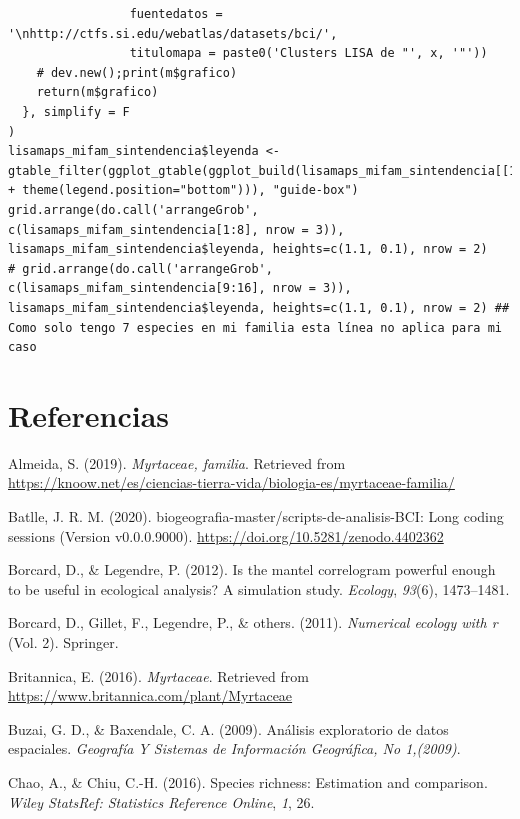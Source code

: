 \documentclass[11pt,]{article}
\begin{document}
\begin{verbatim}
                 fuentedatos = '\nhttp://ctfs.si.edu/webatlas/datasets/bci/',
                 titulomapa = paste0('Clusters LISA de "', x, '"'))
    # dev.new();print(m$grafico)
    return(m$grafico)
  }, simplify = F
)
lisamaps_mifam_sintendencia$leyenda <- gtable_filter(ggplot_gtable(ggplot_build(lisamaps_mifam_sintendencia[[1]] + theme(legend.position="bottom"))), "guide-box")
grid.arrange(do.call('arrangeGrob', c(lisamaps_mifam_sintendencia[1:8], nrow = 3)), lisamaps_mifam_sintendencia$leyenda, heights=c(1.1, 0.1), nrow = 2)
# grid.arrange(do.call('arrangeGrob', c(lisamaps_mifam_sintendencia[9:16], nrow = 3)), lisamaps_mifam_sintendencia$leyenda, heights=c(1.1, 0.1), nrow = 2) ## Como solo tengo 7 especies en mi familia esta línea no aplica para mi caso
\end{verbatim}

\section*{Referencias}\label{referencias}

\hypertarget{refs}{}
\hypertarget{ref-sandra2019myrtaceae}{}
Almeida, S. (2019). \emph{Myrtaceae, familia}. Retrieved from
\url{https://knoow.net/es/ciencias-tierra-vida/biologia-es/myrtaceae-familia/}

\hypertarget{ref-jose_ramon_martinez_batlle_2020_4402362}{}
Batlle, J. R. M. (2020). biogeografia-master/scripts-de-analisis-BCI:
Long coding sessions (Version v0.0.0.9000).
\url{https://doi.org/10.5281/zenodo.4402362}

\hypertarget{ref-borcard2012mantel}{}
Borcard, D., \& Legendre, P. (2012). Is the mantel correlogram powerful
enough to be useful in ecological analysis? A simulation study.
\emph{Ecology}, \emph{93}(6), 1473--1481.

\hypertarget{ref-borcard2011numerical}{}
Borcard, D., Gillet, F., Legendre, P., \& others. (2011).
\emph{Numerical ecology with r} (Vol. 2). Springer.

\hypertarget{ref-encymyrtaceae}{}
Britannica, E. (2016). \emph{Myrtaceae}. Retrieved from
\url{https://www.britannica.com/plant/Myrtaceae}

\hypertarget{ref-buzai2009analisis}{}
Buzai, G. D., \& Baxendale, C. A. (2009). Análisis exploratorio de datos
espaciales. \emph{Geografía Y Sistemas de Información Geográfica, No
1,(2009)}.

\hypertarget{ref-chao2016species}{}
Chao, A., \& Chiu, C.-H. (2016). Species richness: Estimation and
comparison. \emph{Wiley StatsRef: Statistics Reference Online},
\emph{1}, 26.
\end{document}
